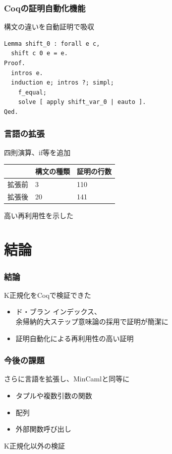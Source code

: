 \documentclass[dvipdfmx,cjk,xcolor=dvipsnames,envcountsect,notheorems,12pt]{beamer}
\theoremstyle{definition}
\begin{document}
\begin{frame}[fragile]
	\frametitle{Coqの証明自動化機能}
	\LARGE 構文の違いを自動証明で吸収

	\vfill

\begin{lstlisting}[frame=none]
Lemma shift_0 : forall e c,
  shift c 0 e = e.
Proof.
  intros e.
  induction e; intros ?; simpl;
    f_equal;
    solve [ apply shift_var_0 | eauto ].
Qed.
\end{lstlisting}
\end{frame}

\begin{frame}
	\frametitle{言語の拡張}
	\LARGE 四則演算、if等を追加
	\begin{center}
		\Large 
		\begin{tabular}{|l||l|l|}
			\hline
			 & 構文の種類 & 証明の行数 \\
			\hline
			\hline
			拡張前 & 3 & 110 \\
			\hline
			拡張後 & 20 & 141 \\
			\hline
		\end{tabular}
	\end{center}

	\vfill

	高い再利用性を示した
\end{frame}

\section{結論}

\begin{frame}
	\frametitle{結論}
	\Large K正規化をCoqで検証できた
	\begin{itemize}
		\item ド・ブラン インデックス、\\余帰納的大ステップ意味論の採用で証明が簡潔に
		\item 証明自動化による再利用性の高い証明
	\end{itemize}
\end{frame}

\begin{frame}
	\frametitle{今後の課題}
	\Large さらに言語を拡張し、MinCamlと同等に
	\begin{itemize}
		\item タプルや複数引数の関数
		\item 配列
		\item 外部関数呼び出し
	\end{itemize}

	\vfill

	K正規化以外の検証
\end{frame}
\end{document}
